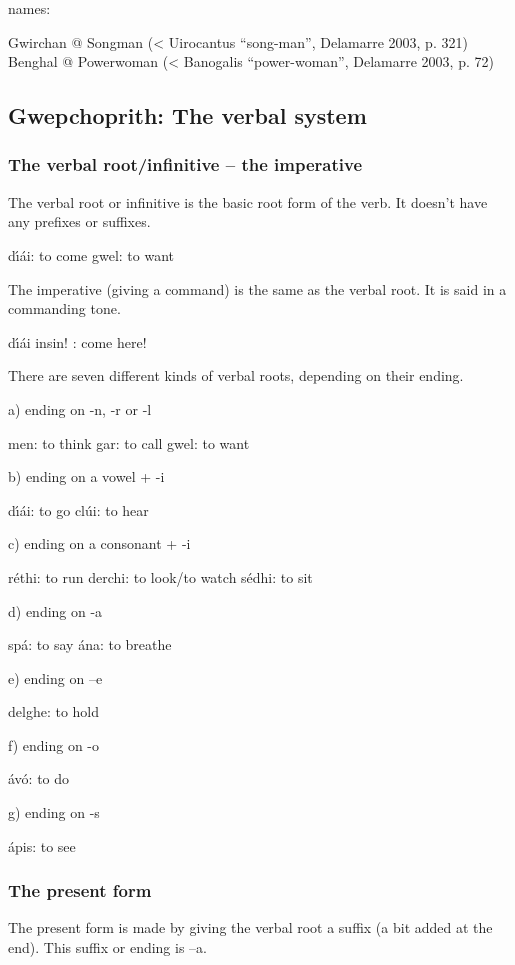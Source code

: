 names: 

Gwirchan @ Songman (< Uirocantus ``song-man'', Delamarre 2003, p. 321)
Benghal @ Powerwoman (< Banogalis ``power-woman'', Delamarre 2003, p. 72)

\subsection{Gwepchoprith: The verbal system}
\subsubsection{The verbal root/infinitive – the imperative}

The verbal root or infinitive is the basic root form of the verb. It doesn’t have any prefixes or suffixes. 

d\'{\i}\'{a}i: to come
gwel: to want

The imperative (giving a command) is the same as the verbal root. It is said in a commanding tone.

d\'{\i}\'{a}i insin! : come here!

There are seven different kinds of verbal roots, depending on their ending.

a) ending on -n, -r or -l

men: to think
gar: to call
gwel: to want

b) ending on a vowel + -i

d\'{\i}\'{a}i: to go
cl\'{u}i: to hear

c) ending on a consonant + -i

r\'{e}thi: to run
derchi: to look/to watch
s\'{e}dhi: to sit

d) ending on -a

sp\'{a}: to say
\'{a}na: to breathe

e) ending on –e

delghe: to hold

f) ending on -o

\'{a}v\'{o}: to do

g) ending on -s

\'{a}pis: to see


\subsubsection{The present form}

The present form is made by giving the verbal root a suffix (a bit added at the end). This suffix or ending is –a. 

